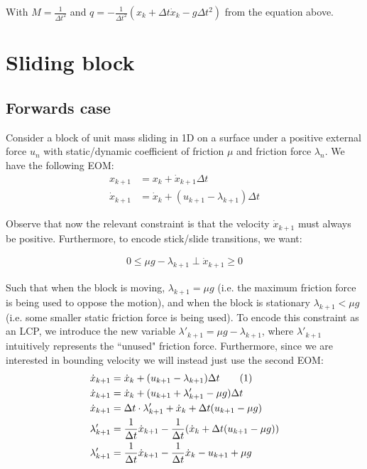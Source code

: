 \documentclass{article}
\newcommand\numberthis{\addtocounter{equation}{1}\tag{\theequation}}
\begin{document}
With $M=\frac{1}{\Delta t^2}$ and $q=- \frac{1}{\Delta t^2} (x_k + \Delta t \dot x_k - g \Delta t^2)$ from the equation above.

\section{Sliding block}
\subsection{Forwards case}
Consider a block of unit mass sliding in 1D on a surface under a positive external force $u_n$ with static/dynamic coefficient of friction $\mu$ and friction force $\lambda_n$. We have the following EOM:
\begin{align*}
    x_{k+1} &= x_k + \dot x_{k+1} \Delta t \\
    \dot x_{k+1} &= \dot x_k + (u_{k+1} - \lambda_{k+1}) \Delta t
\end{align*}

Observe that now the relevant constraint is that the velocity $\dot x_{k+1}$ must always be positive. Furthermore, to encode stick/slide transitions, we want:

\begin{align*}
    0 \leq \mu g - \lambda_{k+1} \perp \dot x_{k+1} \geq 0
\end{align*}

Such that when the block is moving, $\lambda_{k+1} = \mu g$ (i.e. the maximum friction force is being used to oppose the motion), and when the block is stationary $\lambda_{k+1} < \mu g$ (i.e. some smaller static friction force is being used). To encode this constraint as an LCP, we introduce the new variable $\lambda'_{k+1} = \mu g - \lambda_{k+1}$, where $\lambda '_{k+1}$ intuitively represents the ``unused" friction force. Furthermore, since we are interested in bounding velocity we will instead just use the second EOM:
\begin{align*}
    \dot x_{k+1} &= \dot x_k + (u_{k+1} - \lambda_{k+1}) \Delta t  \numberthis \label{fwd_eom} \\
    \dot x_{k+1} &= \dot x_k + (u_{k+1} + \lambda'_{k+1} - \mu g) \Delta t \\
    \dot x_{k+1} &= \Delta t \cdot \lambda'_{k+1} + \dot x_k + \Delta t (u_{k+1} - \mu g) \\
    \lambda'_{k+1} &= \frac{1}{\Delta t} \dot x_{k+1} - \frac{1}{\Delta t} (\dot x_k + \Delta t (u_{k+1} - \mu g))\\
    \lambda'_{k+1} &= \frac{1}{\Delta t} \dot x_{k+1} - \frac{1}{\Delta t} \dot x_k - u_{k+1} + \mu g
\end{align*}
\end{document}
